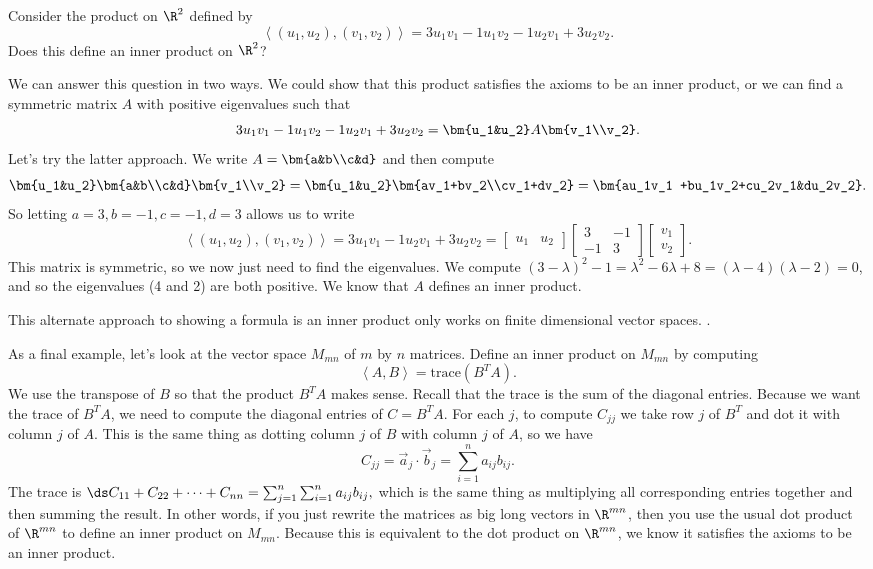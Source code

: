 \begin{example}
Consider the product on $\R^2$ defined by 
$$\left<(u_1, u_2),(v_1,v_2)\right> =3u_1v_1-1u_1v_2-1u_2v_1+3u_2v_2.$$ 
Does this define an inner product on $\R^2$?

We can answer this question in two ways.  
We could show that this product satisfies the axioms to be an inner product, or we can find a symmetric matrix $A$ with positive eigenvalues such that 
$$3u_1v_1-1u_1v_2-1u_2v_1+3u_2v_2= \bm{u_1&u_2}A \bm{v_1\\v_2}.$$
Let's try the latter approach.  We write $A = \bm{a&b\\c&d}$ and then compute 
$$\bm{u_1&u_2}\bm{a&b\\c&d} \bm{v_1\\v_2} 
=\bm{u_1&u_2}\bm{av_1+bv_2\\cv_1+dv_2}
=\bm{au_1v_1 +bu_1v_2+cu_2v_1&du_2v_2}.$$
So letting $a=3, b = -1, c=-1, d=3$ allows us to write
$$\left<(u_1, u_2),(v_1,v_2)\right> =3u_1v_1-1u_2v_1+3u_2v_2=
\begin{bmatrix}u_1&u_2\end{bmatrix}
\begin{bmatrix}3&-1\\-1&3\end{bmatrix}
\begin{bmatrix}v_1\\v_2\end{bmatrix}.
$$ 
This matrix is symmetric, so we now just need to find the eigenvalues. 
We compute $(3-\lambda)^2-1 = \lambda^2-6\lambda+8 = (\lambda-4)(\lambda-2) = 0$, and so the eigenvalues (4 and 2) are both positive. We know that $A$ defines an inner product. 

This alternate approach to showing a formula is an inner product only works on finite dimensional vector spaces. 
.
\end{example}


As a final example, let's look at the vector space $M_{mn}$ of $m$ by $n$ matrices.  
Define an inner product on $M_{mn}$ by computing $$\left<A,B\right>= \text{trace}(B^T A).$$ 
We use the transpose of $B$ so that the product $B^TA$ makes sense. 
Recall that the trace is the sum of the diagonal entries.  
Because we want the trace of $B^TA$, we need to compute the diagonal entries of $C=B^TA$.  
For each $j$, to compute $C_{jj}$ we take row $j$ of $B^T$ and dot it with column $j$ of $A$.  
This is the same thing as dotting column $j$ of $B$ with column $j$ of $A$, so we have 
$$C_{jj} = \vec a_j \cdot \vec b_j = \sum_{i=1}^n a_{ij}b_{ij}.$$
The trace is $\ds C_{11}+C_{22}+\cdots+C_{nn} = \sum_{j=1}^n \sum_{i=1}^n a_{ij}b_{ij},$ which is the same thing as multiplying all corresponding entries together and then summing the result. 
In other words, if you just rewrite the matrices as big long vectors in $\R^{mn}$, then you use the usual dot product of $\R^{mn}$ to define an inner product on $M_{mn}$.  Because this is equivalent to the dot product on $\R^{mn}$, we know it satisfies the axioms to be an inner product.

